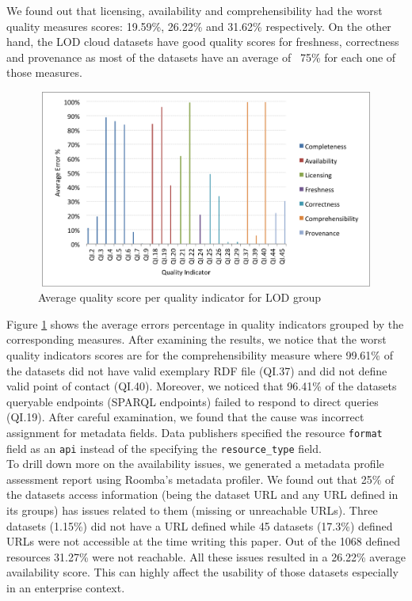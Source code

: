 \documentclass[onecolumn, crcready]{iosart2c}
\begin{document}
We found out that licensing, availability and comprehensibility had the worst quality measures scores: 19.59\%, 26.22\% and 31.62\% respectively. On the other hand, the LOD cloud datasets have good quality scores for freshness, correctness and provenance as most of the datasets have an average of ~75\% for each one of those measures.

\begin{figure}[ht]
  \centering
    \includegraphics[height=6.5cm, width=12cm]{LOD_quality_indicators_grouped.png}
  \caption{Average quality score per quality indicator for LOD group}
  \label{fig:2}
\end{figure}

Figure \ref{fig:2} shows the average errors percentage in quality indicators grouped by the corresponding measures. After examining the results, we notice that the worst quality indicators scores are for the comprehensibility measure where 99.61\% of the datasets did not have valid exemplary RDF file (QI.37) and did not define valid point of contact (QI.40). Moreover, we noticed that 96.41\% of the datasets queryable endpoints (SPARQL endpoints) failed to respond to direct queries (QI.19). After careful examination, we found that the cause was incorrect assignment for metadata fields. Data publishers specified the resource \texttt{format} field as an \texttt{api} instead of the specifying the \texttt{resource\_type} field.\\

To drill down more on the availability issues, we generated a metadata profile assessment report using Roomba's metadata profiler. We found out that 25\% of the datasets access information (being the dataset URL and any URL defined in its groups) has issues related to them (missing or unreachable URLs).
Three datasets (1.15\%) did not have a URL defined while 45 datasets (17.3\%) defined URLs were not accessible at the time writing this paper. Out of the 1068 defined resources 31.27\% were not reachable. All these issues resulted in a 26.22\% average availability score. This can highly affect the usability of those datasets especially in an enterprise context.
\end{document}
